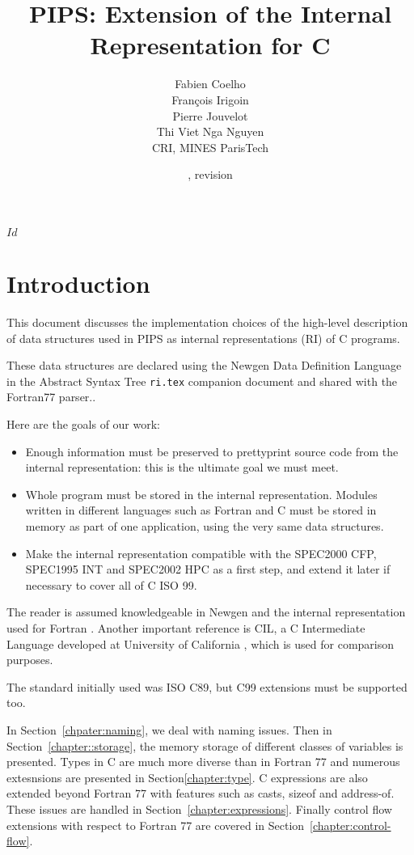\documentclass[a4paper]{report}
\title{PIPS: Extension of the Internal Representation for C}
\author{
  Fabien Coelho \\
  Fran\c{c}ois Irigoin \\
  Pierre Jouvelot \\
  Thi Viet Nga Nguyen \\
  CRI, MINES ParisTech}
\date{\svnInfoLongDate{}, revision \svnInfoRevision}
\begin{document}
\svnInfo $Id$

\noindent
\maketitle
\tableofcontents


\chapter*{Introduction}

This document discusses the implementation choices of the high-level
description of data structures used in PIPS as internal representations
(RI) of C programs.

These data structures are declared using the Newgen Data Definition
Language in the Abstract Syntax Tree \texttt{ri.tex} companion
document and shared with the Fortran77 parser..

Here are the goals of our work:
\begin{itemize}
\item Enough information must be preserved to prettyprint source code
  from the internal representation: this is the ultimate goal we must
  meet.
\item Whole program must be stored in the internal
  representation. Modules written in different languages such as
  Fortran and C must be stored in memory as part of one application,
  using the very same data structures.
\item Make the internal representation compatible with the SPEC2000
  CFP, SPEC1995 INT and SPEC2002 HPC as a first step, and extend it
  later if necessary to cover all of C ISO 99.
\end{itemize}
The reader is assumed knowledgeable in Newgen \cite{Jouv90} and the
internal representation used for Fortran \cite{Coel01}. Another
important reference is CIL, a C Intermediate Language developed at
University of California \cite{Necu02}, which is used for comparison
purposes.

The standard initially used was ISO C89, but C99 extensions must be
supported too.

In Section~\ref{chpater:naming}, we deal with naming issues. Then in
Section~\ref{chapter::storage}, the memory storage of different
classes of variables is presented. Types in C are much more diverse
than in Fortran 77 and numerous extesnsions are presented in
Section\ref{chapter:type}. C expressions are also extended beyond
Fortran 77 with features such as casts, sizeof and address-of. These
issues are handled in Section~\ref{chapter:expressions}. Finally
control flow extensions with respect to Fortran 77 are covered in
Section~\ref{chapter:control-flow}.
\end{document}
